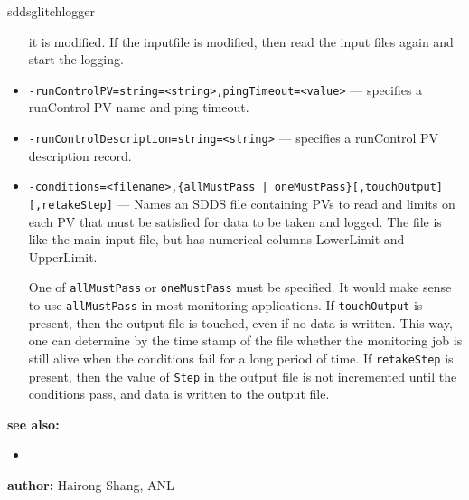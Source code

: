 \begin{sddsprog}{sddsglitchlogger}
\begin{itemize}
                it is modified. If the inputfile is modified, then read the input files again and start
                the logging.
  \item {\tt -runControlPV=string=<string>,pingTimeout=<value>} --- specifies a runControl PV name
                and ping timeout.
  \item {\tt -runControlDescription=string=<string>} --- specifies a runControl PV description record.
  \item {\verb+-conditions=<filename>,{allMustPass | oneMustPass}[,touchOutput][,retakeStep]+} ---
                   Names an SDDS file containing PVs to read and limits on each PV that must
                   be satisfied for data to be taken and logged.  The file is like the main
                   input file, but has numerical columns LowerLimit and UpperLimit.

                One of \verb+allMustPass+ or \verb+oneMustPass+ must be specified. It would make sense
                to use \verb+allMustPass+ in most monitoring applications.
                If \verb+touchOutput+ is present, then the output file is touched, even if no data
                is written. This way, one can determine by the time stamp of the file
                whether the monitoring job is still alive
                when the conditions fail for a long period of time. If \verb+retakeStep+ is
                present, then the value of \verb+Step+ in the output file is not
                incremented until the conditions pass, and data is written to the output file.
\end{itemize}

\item \textbf{see also:}
\begin{itemize}
  \item {}
\end{itemize}
\item \textbf{author:} Hairong Shang, ANL
\end{sddsprog}
